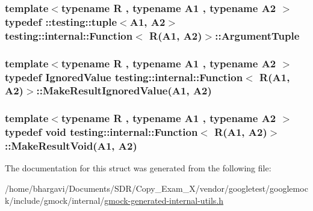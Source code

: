 \subsubsection[{\texorpdfstring{Argument\+Tuple}{ArgumentTuple}}]{\setlength{\rightskip}{0pt plus 5cm}template$<$typename R , typename A1 , typename A2 $>$ typedef \+::testing\+::tuple$<$A1, A2$>$ {\bf testing\+::internal\+::\+Function}$<$ R(A1, A2)$>$\+::{\bf Argument\+Tuple}}\hypertarget{structtesting_1_1internal_1_1_function_3_01_r_07_a1_00_01_a2_08_4_a2de00437877c29ec6cb78396928b8e3e}{}\label{structtesting_1_1internal_1_1_function_3_01_r_07_a1_00_01_a2_08_4_a2de00437877c29ec6cb78396928b8e3e}
\subsubsection[{\texorpdfstring{Make\+Result\+Ignored\+Value}{MakeResultIgnoredValue}}]{\setlength{\rightskip}{0pt plus 5cm}template$<$typename R , typename A1 , typename A2 $>$ typedef {\bf Ignored\+Value} {\bf testing\+::internal\+::\+Function}$<$ R(A1, A2)$>$\+::Make\+Result\+Ignored\+Value(A1, A2)}\hypertarget{structtesting_1_1internal_1_1_function_3_01_r_07_a1_00_01_a2_08_4_a89033ea870fe831b13899ce36666e102}{}\label{structtesting_1_1internal_1_1_function_3_01_r_07_a1_00_01_a2_08_4_a89033ea870fe831b13899ce36666e102}
\subsubsection[{\texorpdfstring{Make\+Result\+Void}{MakeResultVoid}}]{\setlength{\rightskip}{0pt plus 5cm}template$<$typename R , typename A1 , typename A2 $>$ typedef void {\bf testing\+::internal\+::\+Function}$<$ R(A1, A2)$>$\+::Make\+Result\+Void(A1, A2)}\hypertarget{structtesting_1_1internal_1_1_function_3_01_r_07_a1_00_01_a2_08_4_ada1ad22fa21c84ec3faea47ed20c1b46}{}\label{structtesting_1_1internal_1_1_function_3_01_r_07_a1_00_01_a2_08_4_ada1ad22fa21c84ec3faea47ed20c1b46}


The documentation for this struct was generated from the following file\+:\begin{DoxyCompactItemize}
\item 
/home/bhargavi/\+Documents/\+S\+D\+R/\+Copy\+\_\+\+Exam\+\_\+X/vendor/googletest/googlemock/include/gmock/internal/\hyperlink{gmock-generated-internal-utils_8h}{gmock-\/generated-\/internal-\/utils.\+h}\end{DoxyCompactItemize}
